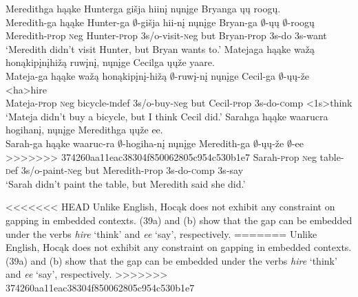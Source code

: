 \documentclass[output=paper]{LSP/langsci}
\begin{document}
\begin{exe}
\begin{xlist}
\ex
\glll Meredithga h\k{a}\k{a}ke Hunterga {gi\v{s}ja hiin\k{i}} n\k{u}n\k{i}ge Bryanga \k{u}\k{u} roog\k{u}.\\
Meredith-ga h\k{a}\k{a}ke Hunter-ga $\emptyset$-{gi\v{s}ja hii-n\k{i}} n\k{u}n\k{i}ge Bryan-ga $\emptyset$-\k{u}\k{u} $\emptyset$-roog\k{u}\\
Meredith-{\textsc prop} {\textsc neg} Hunter-{\textsc prop} {\textsc 3s/o}-visit-{\textsc neg} but Bryan-{\textsc prop} {\textsc 3s}-do {\textsc 3s}-want\\
\trans `Meredith didn't visit Hunter, but Bryan wants to.'
\ex
\glll Matejaga h\k{a}\k{a}ke {wa\v{z}\k{a} hon\k{a}kip\k{i}n\k{i}hi\v{z}\k{a}} ruw\k{i}n\k{i}, n\k{u}n\k{i}ge Cecilga \k{u}\k{u}\v{z}e yaare.\\
Mateja-ga h\k{a}\k{a}ke {wa\v{z}\k{a} hon\k{a}kip\k{i}n\k{i}-hi\v{z}\k{a}} $\emptyset$-ruw\k{i}-n\k{i} n\k{u}n\k{i}ge Cecil-ga $\emptyset$-\k{u}\k{u}-\v{z}e <ha>hire\\
Mateja-{\textsc prop} {\textsc neg} bicycle-{\textsc indef} {\textsc 3s/o}-buy-{\textsc neg} but Cecil-{\textsc prop} {\textsc 3s}-do-{\textsc comp} <{\textsc 1s}>think\\
\trans `Mateja didn't buy a bicycle, but I think Cecil did.'
\ex
\glll Sarahga h\k{a}\k{a}ke waarucra hogihan\k{i}, n\k{u}n\k{i}ge Meredithga \k{u}\k{u}\v{z}e ee.\\
Sarah-ga h\k{a}\k{a}ke waaruc-ra $\emptyset$-hogiha-n\k{i} n\k{u}n\k{i}ge Meredith-ga $\emptyset$-\k{u}\k{u}-\v{z}e $\emptyset$-ee\\
>>>>>>> 374260aa11eac38304f850062805c954c530b1e7
Sarah-{\textsc prop} {\textsc neg} table-{\textsc def} {\textsc 3s/o}-paint-{\textsc neg} but Meredith-{\textsc prop} {\textsc 3s}-do-{\textsc comp} {\textsc 3s}-say\\
\trans `Sarah didn't paint the table, but Meredith said she did.'
\end{xlist}
\end{exe}

<<<<<<< HEAD
Unlike English, Hocąk does not exhibit any constraint on gapping in embedded contexts. (39a) and (b) show that the gap can be embedded under the verbs \emph{hire} `think' and \emph{ee} `say', respectively.
=======
Unlike English, Hoc\k{a}k does not exhibit any constraint on gapping in embedded contexts. (39a) and (b) show that the gap can be embedded under the verbs \emph{hire} `think' and \emph{ee} `say', respectively.
>>>>>>> 374260aa11eac38304f850062805c954c530b1e7
\end{document}
